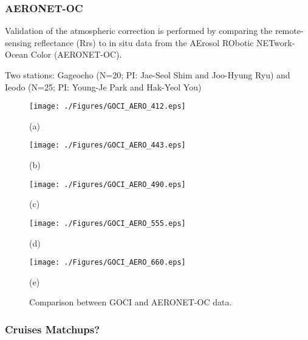 \documentclass[onecolumn,3p,letterpaper,11pt]{elsarticle}
\begin{document}
\subsubsection{AERONET-OC}
Validation of the atmospheric correction is performed by comparing the remote-sensing reflectance (Rrs) to in situ data from the
AErosol RObotic NETwork-Ocean Color (AERONET-OC).

Two stations: Gageocho (N=20; PI: Jae-Seol Shim and Joo-Hyung Ryu) and Ieodo (N=25; PI: Young-Je Park and Hak-Yeol You)

\begin{figure}[htb!]
    \begin{minipage}[c]{0.48\linewidth}
      \centering
      \texttt{[image: ./Figures/GOCI\_AERO\_412.eps]}
    \centerline{(a)}\medskip
    \end{minipage}  
    \hfill
    \begin{minipage}[c]{0.48\linewidth}
      \centering
      \texttt{[image: ./Figures/GOCI\_AERO\_443.eps]}
      \centerline{(b)}\medskip
    \end{minipage}  

  \begin{minipage}[c]{0.48\linewidth}
      \centering
      \texttt{[image: ./Figures/GOCI\_AERO\_490.eps]}
    \centerline{(c)}\medskip
    \end{minipage}  
    \hfill
    \begin{minipage}[c]{0.48\linewidth}
      \centering
      \texttt{[image: ./Figures/GOCI\_AERO\_555.eps]}
      \centerline{(d)}\medskip
    \end{minipage}  

  \begin{minipage}[c]{1.0\linewidth}
      \centering
      \texttt{[image: ./Figures/GOCI\_AERO\_660.eps]}
      \centerline{(e)}\medskip
    \end{minipage}   

    \caption{Comparison between GOCI and AERONET-OC data. \label{fig:GOCI_AERO} } 
\end{figure}
\subsubsection{Cruises Matchups?}

\end{document}
